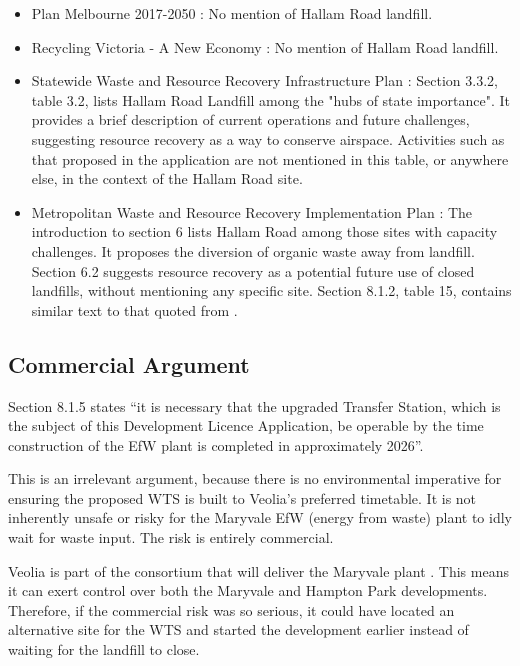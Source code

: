 \documentclass{article}
\begin{document}
\begin{itemize}
  \item Plan Melbourne 2017-2050 \cite{planmelb}: No mention of Hallam Road landfill.
  \item Recycling Victoria - A New Economy \cite{recyclingvic}: No mention of Hallam Road landfill.
  \item Statewide Waste and Resource Recovery Infrastructure Plan \cite{swrrip}: Section 3.3.2, table 3.2, lists Hallam Road Landfill among the "hubs of state importance". It provides a brief description of current operations and future challenges, suggesting resource recovery as a way to conserve airspace. Activities such as that proposed in the application are not mentioned in this table, or anywhere else, in the context of the Hallam Road site.
  \item Metropolitan Waste and Resource Recovery Implementation Plan \cite{mwrrip}: The introduction to section 6 lists Hallam Road among those sites with capacity challenges. It proposes the diversion of organic waste away from landfill. Section 6.2 suggests resource recovery as a potential future use of closed landfills, without mentioning any specific site. Section 8.1.2, table 15, contains similar text to that quoted from \cite{swrrip}.
\end{itemize}

\subsection{Commercial Argument}

Section 8.1.5 states “it is necessary that the upgraded Transfer Station, which is the subject of this Development Licence Application, be operable by the time construction of the EfW plant is completed in approximately 2026”.

This is an irrelevant argument, because there is no environmental imperative for ensuring the proposed WTS is built to Veolia's preferred timetable. It is not inherently unsafe or risky for the Maryvale EfW (energy from waste) plant to idly wait for waste input. The risk is entirely commercial. 

Veolia is part of the consortium that will deliver the Maryvale plant \cite{maryvaleefw}. This means it can exert control over both the Maryvale and Hampton Park developments. Therefore, if the commercial risk was so serious, it could have located an alternative site for the WTS and started the development earlier instead of waiting for the landfill to close.
\end{document}
